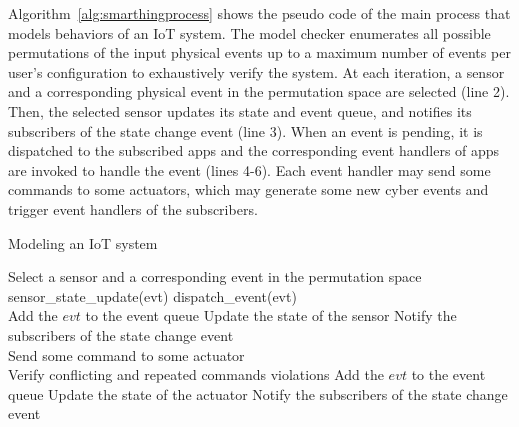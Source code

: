 Algorithm~\ref{alg:smarthingprocess} shows the pseudo code of the main process that models behaviors of an IoT system.
The model checker enumerates all possible permutations of the input physical events
up to a maximum number of events per user's configuration
to exhaustively verify the system.
At each iteration, a sensor and a corresponding physical event in the permutation space are selected (line 2).
Then, the selected sensor updates its state and event queue,
and notifies its subscribers of the state change event (line 3).
When an event is pending,
it is dispatched to the subscribed apps and the corresponding event handlers of apps are invoked to handle the event (lines 4-6).
Each event handler may send some commands to some actuators,
which may generate some new cyber events and trigger event handlers of the subscribers.

\begin{algorithm}[tb]
\ssp
\small
 \caption{Modeling an IoT system}
 \label{alg:smarthingprocess}
 \begin{algorithmic}[1]
  \STATE Select a sensor and a corresponding event in the permutation space 
  \STATE sensor\_state\_update(evt)
  	\STATE dispatch\_event(evt) 
  \ENDWHILE
  \ENDFOR
  \\ 
 	\STATE Add the $evt$ to the event queue
 	\STATE Update the state of the sensor
 	\STATE Notify the subscribers of the state change event
 \ENDIF
  \\ 
 	\STATE Send some command to some actuator 
 \ENDIF
  \\ 
  \STATE Verify conflicting and repeated commands violations
 	\STATE Add the $evt$ to the event queue
 	\STATE Update the state of the actuator
 	\STATE Notify the subscribers of the state change event
 \ENDIF
 \end{algorithmic}
 \end{algorithm}



